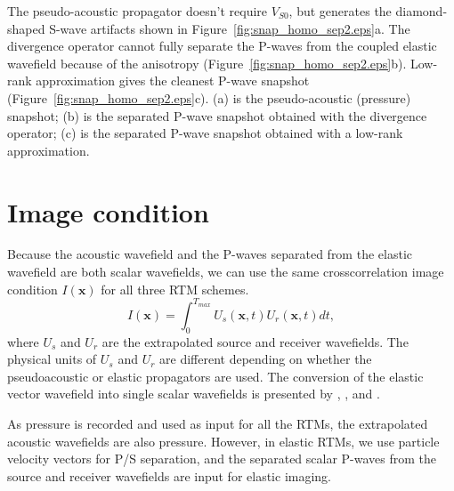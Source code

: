 \documentclass[manuscript,ulem,graphix,revised]{geophysics}
\begin{document}
The pseudo-acoustic propagator doesn't require $V_{S0}$, but generates the diamond-shaped S-wave artifacts \citep{alkhalifah00,grechka04} shown in Figure~\ref{fig:snap_homo_sep2.eps}a. The divergence operator cannot fully separate the P-waves from the coupled elastic wavefield because of the anisotropy (Figure~\ref{fig:snap_homo_sep2.eps}b). Low-rank approximation gives the cleanest P-wave snapshot (Figure~\ref{fig:snap_homo_sep2.eps}c). 
{
(a) is the pseudo-acoustic (pressure) snapshot; (b) is the separated P-wave snapshot obtained with the divergence operator; (c) is the separated P-wave snapshot obtained with a low-rank approximation.
}

\section{Image condition}
\indent\indent
Because the acoustic wavefield and the P-waves separated from the elastic wavefield are both scalar wavefields, we can use the same crosscorrelation image condition $I(\boldsymbol{x})$ for all three RTM schemes.
\begin{equation}
I(\boldsymbol{x})=\int_{0}^{T_{max}}U_s(\boldsymbol{x},t)U_r(\boldsymbol{x},t)dt,
\label{eqn:image_cdt}
\end{equation}
where $U_s$ and $U_r$ are the extrapolated source and receiver wavefields. The physical units of $U_s$ and $U_r$ are different depending on whether the pseudoacoustic or elastic propagators are used. The conversion of the elastic vector wavefield into single scalar wavefields is presented by \citet{sun06}, \citet{wenlong15b}, \citet{ting16} and \citet{tang18}. 

As pressure is recorded and used as input for all the RTMs, the extrapolated acoustic wavefields are also pressure. However, in elastic RTMs, we use particle velocity vectors for P/S separation, and the separated scalar P-waves from the source and receiver wavefields are input for elastic imaging. 
\end{document}
